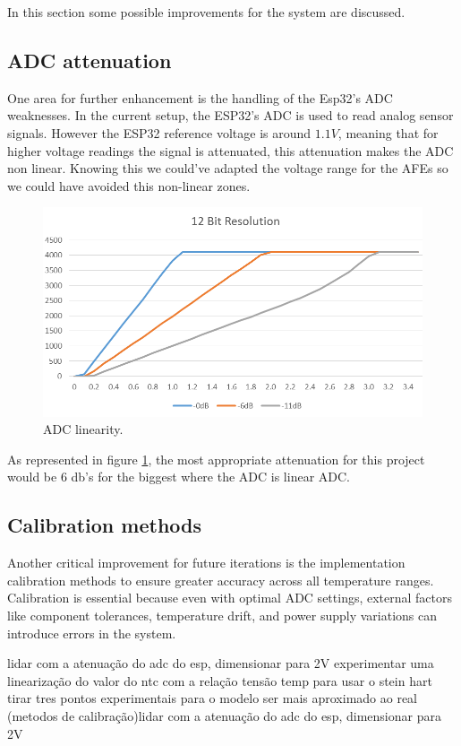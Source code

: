 \documentclass[12pt]{article}
\begin{document}
    In this section some possible improvements for the system are discussed.

\subsection{ADC attenuation }

One area for further enhancement is the handling of the Esp32's ADC weaknesses. In the current setup, the ESP32's ADC is used to read analog sensor signals. However the ESP32 reference voltage is around $1.1V$, meaning that for higher voltage readings the signal is attenuated, this attenuation makes the ADC non linear. 
Knowing this we could've adapted the voltage range for the AFEs so we could have avoided this non-linear zones. 

\begin{figure}[H] 
    \centering
    \includegraphics*[scale = 0.4]{images/ADC-linearity-test-at-12-bit-resolution.png}
    \caption{ADC linearity\cite{ESP32_microcontroller}.}
    \label{fig:ADClinear}
\end{figure}

As represented in figure \ref{fig:ADClinear}, the most appropriate attenuation for this project would be 6 db's for the biggest where the ADC is linear ADC.

\subsection{ Calibration methods }

Another critical improvement for future iterations is the implementation calibration methods to ensure greater accuracy across all temperature ranges. Calibration is essential because even with optimal ADC settings, external factors like component tolerances, temperature drift, and power supply variations can introduce errors in the system.


lidar com a atenuação do adc do esp, dimensionar para 2V
experimentar uma linearização do valor do ntc com a relação tensão temp
para usar o stein hart tirar tres pontos experimentais para o modelo ser mais aproximado ao real 
(metodos de calibração)lidar com a atenuação do adc do esp, dimensionar para 2V

\newpage

\end{document}

